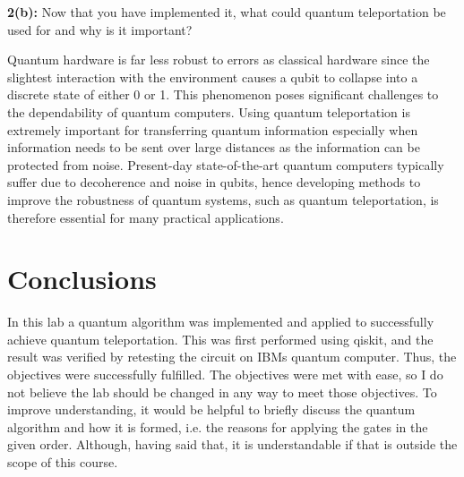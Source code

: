 \textbf{2(b):} Now that you have implemented it, what could quantum teleportation be used for and why is it important?

Quantum hardware is far less robust to errors as classical hardware since the slightest interaction with the environment causes a qubit to collapse into a discrete state of either 0 or 1. This phenomenon poses significant challenges to the dependability of quantum computers. Using quantum teleportation is extremely important for transferring quantum information especially when information needs to be sent over large distances as the information can be protected from noise.
Present-day state-of-the-art quantum computers typically suffer due to decoherence and noise in qubits, hence developing methods to improve the robustness of quantum systems, such as quantum teleportation, is therefore essential for many practical applications.

\section{Conclusions}

In this lab a quantum algorithm was implemented and applied to successfully achieve quantum teleportation. This was first performed using qiskit, and the result was verified by retesting the circuit on IBMs quantum computer. Thus, the objectives were successfully fulfilled. The objectives were met with ease, so I do not believe the lab should be changed in any way to meet those objectives.
To improve understanding, it would be helpful to briefly discuss the quantum algorithm and how it is formed, i.e. the reasons for applying the gates in the given order. Although, having said that, it is understandable if that is outside the scope of this course.